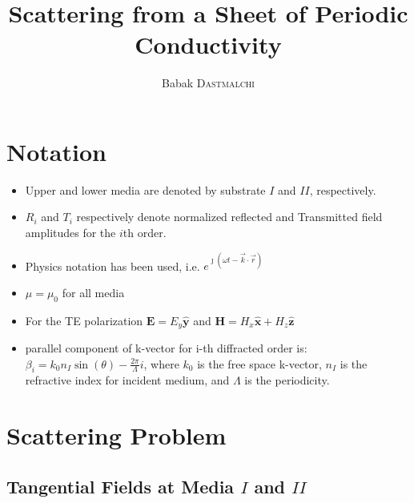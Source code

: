 \documentclass{article}
\title{Scattering from a Sheet of Periodic Conductivity} %
\author{Babak \textsc{Dastmalchi}} %
\begin{document}
\maketitle %





\section{Notation}

\begin{itemize}
\item Upper and lower media are denoted by substrate $I$ and $II$, respectively. 
\item $R_i$ and $T_i$ respectively denote normalized reflected and Transmitted field amplitudes for the $i$th order.
\item Physics notation has been used, i.e. $ e^{\jmath(\omega t - \vec{k} \cdot \vec{r})} $
\item $\mu=\mu_0$ for all media
\item For the TE polarization $\mathbf{E}=E_y\mathbf{\hat{y}}$ and $\mathbf{H}=H_x\mathbf{\hat{x}}+H_z\mathbf{\hat{z}}$
\item parallel component of k-vector for i-th diffracted order is: $\beta_i=k_0 n_I \sin(\theta) - \frac{2\pi}{\Lambda} i$, where $k_0$ is the free space k-vector, $n_I$ is the refractive index for incident medium, and $\Lambda$ is the periodicity.
\end{itemize}





\section{Scattering Problem}

\subsection{Tangential Fields at Media $I$ and $II$}
\end{document}
